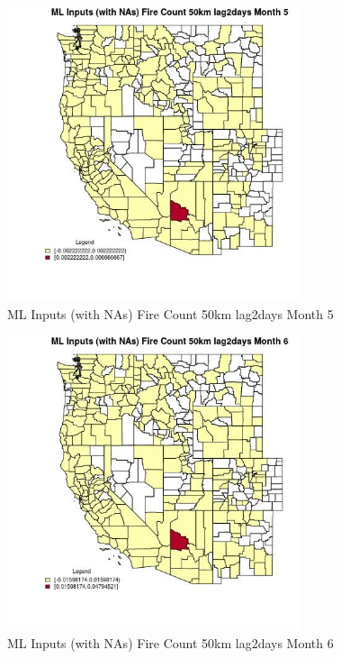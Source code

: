 \begin{figure} 
\centering  
\includegraphics[width=0.77\textwidth]{Code_Outputs/Report_ML_input_PM25_Step4_part_e_de_duplicated_aves_compiled_2019-05-21wNAs_CountyFire_Count_50km_lag2daysmedianMonth5.jpg} 
\caption{\label{fig:Report_ML_input_PM25_Step4_part_e_de_duplicated_aves_compiled_2019-05-21wNAsCountyFire_Count_50km_lag2daysmedianMonth5}ML Inputs (with NAs) Fire Count 50km lag2days Month 5} 
\end{figure} 
 

\begin{figure} 
\centering  
\includegraphics[width=0.77\textwidth]{Code_Outputs/Report_ML_input_PM25_Step4_part_e_de_duplicated_aves_compiled_2019-05-21wNAs_CountyFire_Count_50km_lag2daysmedianMonth6.jpg} 
\caption{\label{fig:Report_ML_input_PM25_Step4_part_e_de_duplicated_aves_compiled_2019-05-21wNAsCountyFire_Count_50km_lag2daysmedianMonth6}ML Inputs (with NAs) Fire Count 50km lag2days Month 6} 
\end{figure} 
 

